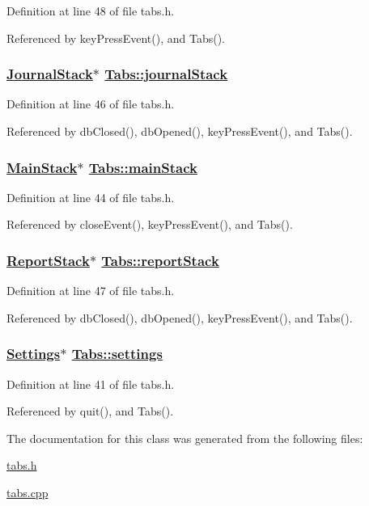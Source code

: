 Definition at line 48 of file tabs.h.

Referenced by key\-Press\-Event(), and Tabs().\hypertarget{classTabs_r5}{
\subsubsection[journalStack]{\setlength{\rightskip}{0pt plus 5cm}\hyperlink{classJournalStack}{Journal\-Stack}$\ast$ \hyperlink{classTabs_r5}{Tabs::journal\-Stack}}}
\label{classTabs_r5}


Definition at line 46 of file tabs.h.

Referenced by db\-Closed(), db\-Opened(), key\-Press\-Event(), and Tabs().\hypertarget{classTabs_r3}{
\subsubsection[mainStack]{\setlength{\rightskip}{0pt plus 5cm}\hyperlink{classMainStack}{Main\-Stack}$\ast$ \hyperlink{classTabs_r3}{Tabs::main\-Stack}}}
\label{classTabs_r3}


Definition at line 44 of file tabs.h.

Referenced by close\-Event(), key\-Press\-Event(), and Tabs().\hypertarget{classTabs_r6}{
\subsubsection[reportStack]{\setlength{\rightskip}{0pt plus 5cm}\hyperlink{classReportStack}{Report\-Stack}$\ast$ \hyperlink{classTabs_r6}{Tabs::report\-Stack}}}
\label{classTabs_r6}


Definition at line 47 of file tabs.h.

Referenced by db\-Closed(), db\-Opened(), key\-Press\-Event(), and Tabs().\hypertarget{classTabs_r1}{
\subsubsection[settings]{\setlength{\rightskip}{0pt plus 5cm}\hyperlink{classSettings}{Settings}$\ast$ \hyperlink{classTabs_r1}{Tabs::settings}}}
\label{classTabs_r1}


Definition at line 41 of file tabs.h.

Referenced by quit(), and Tabs().

The documentation for this class was generated from the following files:\begin{CompactItemize}
\item 
\hyperlink{tabs_8h}{tabs.h}\item 
\hyperlink{tabs_8cpp}{tabs.cpp}\end{CompactItemize}
